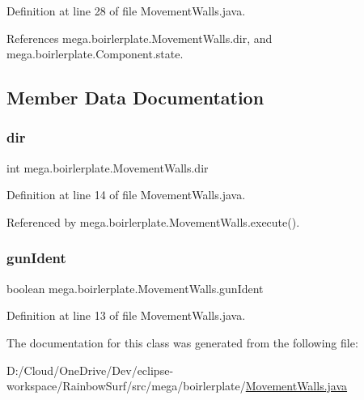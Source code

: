 Definition at line 28 of file Movement\+Walls.\+java.



References mega.\+boirlerplate.\+Movement\+Walls.\+dir, and mega.\+boirlerplate.\+Component.\+state.



\subsection{Member Data Documentation}
\mbox{\label{classmega_1_1boirlerplate_1_1_movement_walls_a0fe9185ce9bcf6ec62923ac2ef0f7704}} 
\subsubsection{\texorpdfstring{dir}{dir}}
{\footnotesize\ttfamily int mega.\+boirlerplate.\+Movement\+Walls.\+dir\hspace{0.3cm}{\ttfamily [private]}}



Definition at line 14 of file Movement\+Walls.\+java.



Referenced by mega.\+boirlerplate.\+Movement\+Walls.\+execute().

\mbox{\label{classmega_1_1boirlerplate_1_1_movement_walls_a621ded8f3c9534eeb83cc84a5da7a073}} 
\subsubsection{\texorpdfstring{gun\+Ident}{gunIdent}}
{\footnotesize\ttfamily boolean mega.\+boirlerplate.\+Movement\+Walls.\+gun\+Ident\hspace{0.3cm}{\ttfamily [private]}}



Definition at line 13 of file Movement\+Walls.\+java.



The documentation for this class was generated from the following file\+:\begin{DoxyCompactItemize}
\item 
D\+:/\+Cloud/\+One\+Drive/\+Dev/eclipse-\/workspace/\+Rainbow\+Surf/src/mega/boirlerplate/\hyperlink{_movement_walls_8java}{Movement\+Walls.\+java}\end{DoxyCompactItemize}
